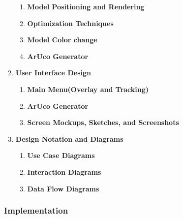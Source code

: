 \documentclass[12pt]{article}
\begin{document}
\begin{enumerate}
\begin{enumerate}
                  \item \textbf{Model Positioning and Rendering}

                  \item \textbf{Optimization Techniques}

                  \item \textbf{Model Color change}

                  \item \textbf{ArUco Generator}

            \end{enumerate}


      \item \textbf{User Interface Design}
            \begin{enumerate}
                  \item \textbf{Main Menu(Overlay and Tracking)}


                  \item \textbf{ArUco Generator}


                  \item \textbf{Screen Mockups, Sketches, and Screenshots}


            \end{enumerate}


      \item \textbf{Design Notation and Diagrams}
            \begin{enumerate}
                  \item \textbf{Use Case Diagrams}

                  \item \textbf{Interaction Diagrams}

                  \item \textbf{Data Flow Diagrams}
            \end{enumerate}
\end{enumerate}

\subsubsection{Implementation}
\end{document}
